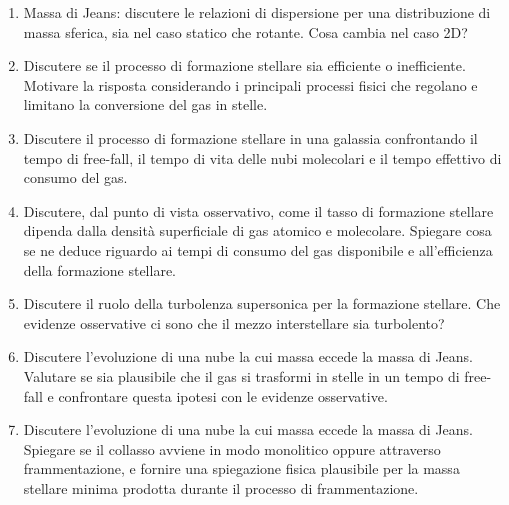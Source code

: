 \begin{enumerate}
    \item Massa di Jeans: discutere le relazioni di dispersione per una distribuzione di massa sferica, sia nel caso statico che rotante. Cosa cambia nel caso 2D?
    \item Discutere se il processo di formazione stellare sia efficiente o inefficiente. Motivare la risposta considerando i principali processi fisici che regolano e limitano la conversione del gas in stelle.
    \item  Discutere il processo di formazione stellare in una galassia confrontando il tempo di free-fall, il tempo di vita delle nubi molecolari e il tempo effettivo di consumo del gas.
    \item Discutere, dal punto di vista osservativo, come il tasso di formazione stellare dipenda dalla densità superficiale di gas atomico e molecolare. Spiegare cosa se ne deduce riguardo ai tempi di consumo del gas disponibile e all’efficienza della formazione stellare.
    \item  Discutere il ruolo della turbolenza supersonica per la formazione stellare. Che evidenze osservative ci sono che il mezzo interstellare sia turbolento?
    \item Discutere l’evoluzione di una nube la cui massa eccede la massa di Jeans. Valutare se sia plausibile che il gas si trasformi in stelle in un tempo di free-fall e confrontare questa ipotesi con le evidenze osservative.
    \item Discutere l’evoluzione di una nube la cui massa eccede la massa di Jeans. Spiegare se il collasso avviene in modo monolitico oppure attraverso frammentazione, e fornire una spiegazione fisica plausibile per la massa stellare minima prodotta durante il processo di frammentazione.
\end{enumerate}